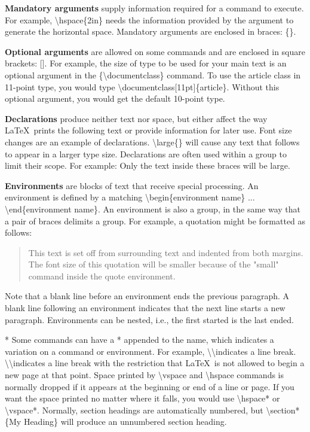 \documentclass[12pt,openright]{book}
\begin{document}
\textbf{Mandatory arguments} supply information required for a command to execute. For
example, \textbackslash hspace\{2in\} needs the information provided by the argument to generate the horizontal space. Mandatory arguments are enclosed in braces: \{\}.

\textbf{Optional arguments} are allowed on some commands and are enclosed in square brackets: []. For example, the size of type to be used for your main text is an optional argument in the \{\textbackslash documentclass\} command. To use the article class in 11-point type, you would type \textbackslash documentclass[11pt]\{article\}. Without this optional argument, you would get the default 10-point type.

\textbf{Declarations} produce neither text nor space, but either affect the way \LaTeX\ prints the following text or provide information for later use. Font size changes are an example of declarations. \textbackslash large\{\} will cause any text that follows to appear in a larger type size. Declarations are often used within a group to limit their scope. For example: {\large Only the text inside these braces will be large.}


\textbf{Environments} are blocks of text that receive special processing. An environment is defined by a matching \textbackslash begin\{environment name\} ... \textbackslash end\{environment name\}. An environment is also a group, in the same way that a pair of braces delimits a group. For example, a quotation might be formatted as follows:

\begin{quote}
  \small This text is set off from surrounding text and indented from both margins. The font size of this quotation will be smaller because of the "small" command inside the quote environment.
\end{quote}

Note that a blank line before an environment ends the previous paragraph. A blank line following an environment indicates that the next line starts a new paragraph. Environments can be nested, i.e., the first started is the last ended.

* Some commands can have a * appended to the name, which indicates a variation on a command or environment. For example, \textbackslash\textbackslash indicates a line break. \textbackslash\textbackslash* indicates a line break with the restriction that \LaTeX\ is not allowed to begin a new page at that point. Space printed by \textbackslash vspace and \textbackslash hspace commands is normally dropped if it appears at the beginning or end of a line or page. If you want the space printed no matter where it falls, you would use \textbackslash hspace* or \textbackslash vspace*. Normally, section headings are automatically numbered, but \textbackslash section*\{My Heading\} will produce an unnumbered section heading.
\end{document}
